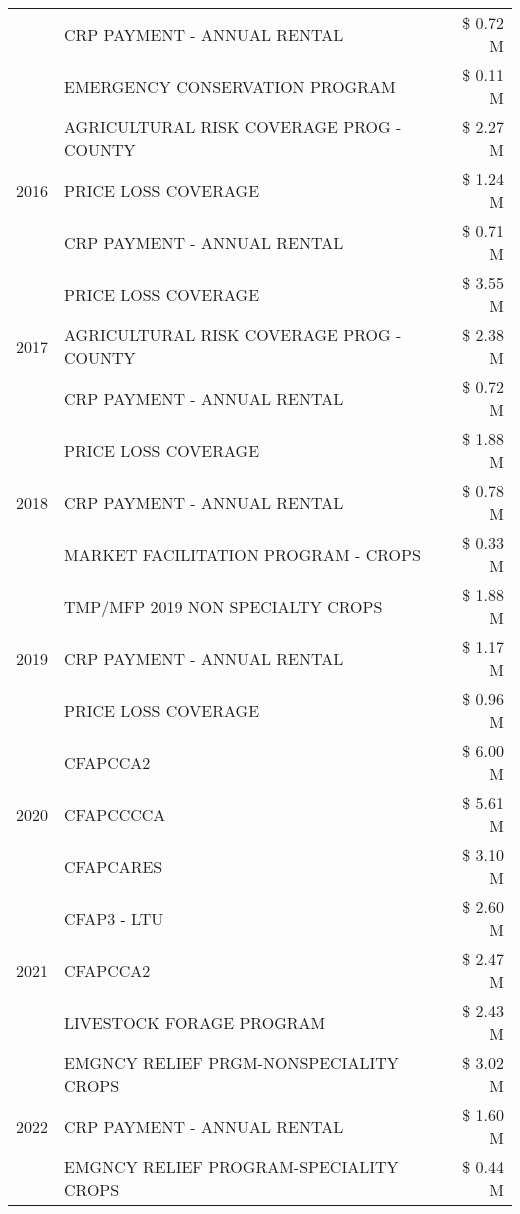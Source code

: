 \begin{tabular}{llr}
 & CRP PAYMENT - ANNUAL RENTAL & \$ 0.72 M \\
 & EMERGENCY CONSERVATION PROGRAM & \$ 0.11 M \\
\cline{1-3}
\multirow[t]{3}{*}{2016} & AGRICULTURAL RISK COVERAGE PROG - COUNTY & \$ 2.27 M \\
 & PRICE LOSS COVERAGE & \$ 1.24 M \\
 & CRP PAYMENT - ANNUAL RENTAL & \$ 0.71 M \\
\cline{1-3}
\multirow[t]{3}{*}{2017} & PRICE LOSS COVERAGE & \$ 3.55 M \\
 & AGRICULTURAL RISK COVERAGE PROG - COUNTY & \$ 2.38 M \\
 & CRP PAYMENT - ANNUAL RENTAL & \$ 0.72 M \\
\cline{1-3}
\multirow[t]{3}{*}{2018} & PRICE LOSS COVERAGE & \$ 1.88 M \\
 & CRP PAYMENT - ANNUAL RENTAL & \$ 0.78 M \\
 & MARKET FACILITATION PROGRAM - CROPS & \$ 0.33 M \\
\cline{1-3}
\multirow[t]{3}{*}{2019} & TMP/MFP 2019 NON SPECIALTY CROPS & \$ 1.88 M \\
 & CRP PAYMENT - ANNUAL RENTAL & \$ 1.17 M \\
 & PRICE LOSS COVERAGE & \$ 0.96 M \\
\cline{1-3}
\multirow[t]{3}{*}{2020} & CFAPCCA2 & \$ 6.00 M \\
 & CFAPCCCCA & \$ 5.61 M \\
 & CFAPCARES & \$ 3.10 M \\
\cline{1-3}
\multirow[t]{3}{*}{2021} & CFAP3 - LTU & \$ 2.60 M \\
 & CFAPCCA2 & \$ 2.47 M \\
 & LIVESTOCK FORAGE PROGRAM & \$ 2.43 M \\
\cline{1-3}
\multirow[t]{3}{*}{2022} & EMGNCY RELIEF PRGM-NONSPECIALITY CROPS & \$ 3.02 M \\
 & CRP PAYMENT - ANNUAL RENTAL & \$ 1.60 M \\
 & EMGNCY RELIEF PROGRAM-SPECIALITY CROPS & \$ 0.44 M \\
\cline{1-3}
\bottomrule
\end{tabular}
